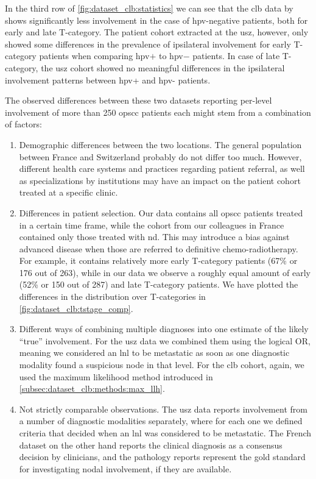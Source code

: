 \documentclass[\relativeRoot/main.tex]{subfiles}
\begin{document}
In the third row of \cref{fig:dataset_clb:statistics} we can see that the \gls{clb} data by  shows significantly less involvement in the case of \gls{hpv}-negative patients, both for early and late T-category. The patient cohort extracted at the \gls{usz}, however, only showed some differences in the prevalence of ipsilateral involvement for early T-category patients when comparing \gls{hpv}$+$ to \gls{hpv}$-$ patients. In case of late T-category, the \gls{usz} cohort showed no meaningful differences in the ipsilateral involvement patterns between \gls{hpv}+ and \gls{hpv}- patients.

The observed differences between these two datasets reporting per-level involvement of more than 250 \gls{opscc} patients each might stem from a combination of factors:

\begin{enumerate}
    \item Demographic differences between the two locations. The general population between France and Switzerland probably do not differ too much. However, different health care systems and practices regarding patient referral, as well as specializations by institutions may have an impact on the patient cohort treated at a specific clinic.
    \item Differences in patient selection. Our data contains all \gls{opscc} patients treated in a certain time frame, while the cohort from our colleagues in France contained only those treated with \acrlong{nd}. This may introduce a bias against advanced disease when those are referred to definitive chemo-radiotherapy. For example, it contains relatively more early T-category patients (67\% or 176 out of 263), while in our data we observe a roughly equal amount of early (52\% or 150 out of 287) and late T-category patients. We have plotted the differences in the distribution over T-categories in \cref{fig:dataset_clb:tstage_comp}.
    \item Different ways of combining multiple diagnoses into one estimate of the likely ``true'' involvement. For the \gls{usz} data we combined them using the logical OR, meaning we considered an \gls{lnl} to be metastatic as soon as one diagnostic modality found a suspicious node in that level. For the \gls{clb} cohort, again, we used the maximum likelihood method introduced in \cref{subsec:dataset_clb:methods:max_llh}.
    \item Not strictly comparable observations. The \gls{usz} data reports involvement from a number of diagnostic modalities separately, where for each one we defined criteria that decided when an \gls{lnl} was considered to be metastatic. The French dataset on the other hand reports the clinical diagnosis as a consensus decision by clinicians, and the pathology reports represent the gold standard for investigating nodal involvement, if they are available.
\end{enumerate}
\end{document}
